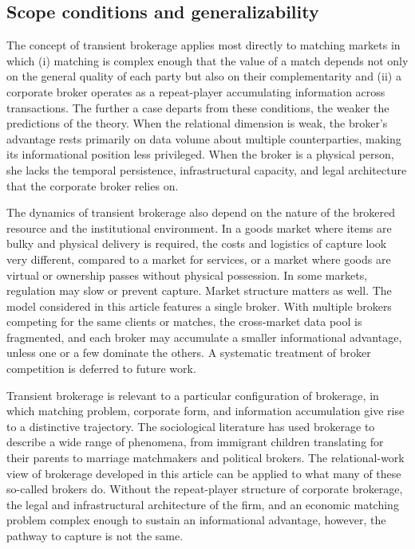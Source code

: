 \documentclass[
]{article}
\begin{document}
\subsection{Scope conditions and generalizability}

The concept of transient brokerage applies most directly to matching markets in which (i) matching is complex enough that the value of a match depends not only on the general quality of each party but also on their complementarity and (ii) a corporate broker operates as a repeat-player accumulating information across transactions. The further a case departs from these conditions, the weaker the predictions of the theory. When the relational dimension is weak, the broker's advantage rests primarily on data volume about multiple counterparties, making its informational position less privileged. When the broker is a physical person, she lacks the temporal persistence, infrastructural capacity, and legal architecture that the corporate broker relies on.

The dynamics of transient brokerage also depend on the nature of the brokered resource and the institutional environment. In a goods market where items are bulky and physical delivery is required, the costs and logistics of capture look very different, compared to a market for services, or a market where goods are virtual or ownership passes without physical possession. In some markets, regulation may slow or prevent capture. Market structure matters as well. The model considered in this article features a single broker. With multiple brokers competing for the same clients or matches, the cross-market data pool is fragmented, and each broker may accumulate a smaller informational advantage, unless one or a few dominate the others. A systematic treatment of broker competition is deferred to future work.

Transient brokerage is relevant to a particular configuration of brokerage, in which matching problem, corporate form, and information accumulation give rise to a distinctive trajectory. The sociological literature has used brokerage to describe a wide range of phenomena, from immigrant children translating for their parents to marriage matchmakers and political brokers. The relational-work view of brokerage developed in this article can be applied to what many of these so-called brokers do. Without the repeat-player structure of corporate brokerage, the legal and infrastructural architecture of the firm, and an economic matching problem complex enough to sustain an informational advantage, however, the pathway to capture is not the same.
\end{document}
